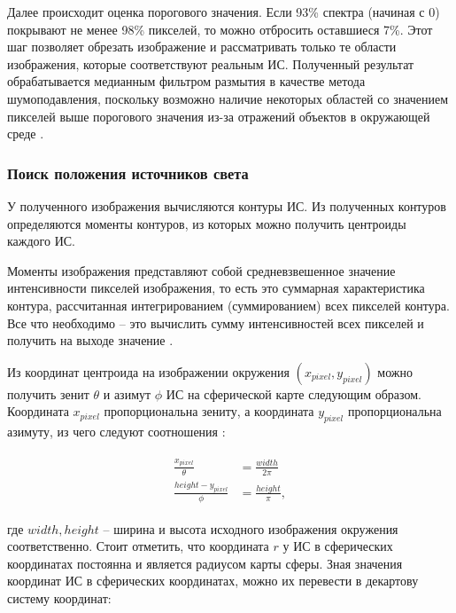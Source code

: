 Далее происходит оценка порогового значения. Если 93\% спектра (начиная с 0) покрывают не менее 98\% пикселей, то можно отбросить оставшиеся 7\%. Этот шаг позволяет обрезать изображение и рассматривать только те области изображения, которые соответствуют реальным ИС. Полученный результат обрабатывается медианным фильтром размытия в качестве метода шумоподавления, поскольку возможно наличие некоторых областей со значением пикселей выше порогового значения из-за отражений объектов в окружающей среде \cite{osti2019real}.

\subsubsection*{Поиск положения источников света}

У полученного изображения вычисляются контуры ИС. Из полученных контуров определяются моменты контуров, из которых можно получить центроиды каждого ИС. 

Моменты изображения представляют собой средневзвешенное значение интенсивности пикселей изображения, то есть это суммарная характеристика контура, рассчитанная интегрированием (суммированием) всех пикселей контура. Все что необходимо -- это вычислить сумму интенсивностей всех пикселей и получить на выходе значение \cite{sns_tras}.

Из координат центроида на изображении окружения $(x_{pixel}, y_{pixel})$ можно получить зенит $\theta$ и азимут $\phi$ ИС на сферической карте следующим образом. Координата $x_{pixel}$ пропорциональна зениту, а координата $y_{pixel}$ пропорциональна азимуту, из чего следуют соотношения \cite{osti2019real}:

\begin{equation}
	\begin{aligned}
		\begin{split}
			\frac{x_{pixel}}{\theta} &= \frac{width}{2\pi} \\
			\frac{height - y_{pixel}}{\phi} &= \frac{height}{\pi}, 
		\end{split}
	\end{aligned}
\end{equation}

где $width, height$ -- ширина и высота исходного изображения окружения соответственно. Стоит отметить, что координата $r$ у ИС в сферических координатах постоянна и является радиусом карты сферы. Зная значения координат ИС в сферических координатах, можно их перевести в декартову систему координат:

